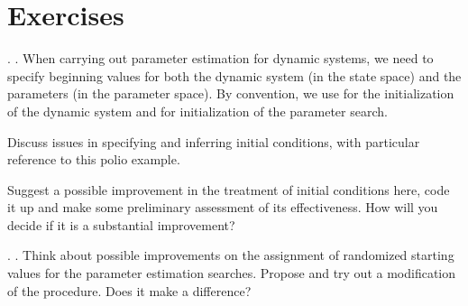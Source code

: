 \section{Exercises}


\begin{frame}[fragile]

\myexercise. . When carrying out parameter estimation for dynamic systems, we need to specify beginning values for both the dynamic system (in the state space) and the parameters (in the parameter space). By convention, we use   for the initialization of the dynamic system and  for initialization of the parameter search.

Discuss issues in specifying and inferring initial conditions, with particular reference to this polio example. 

Suggest a possible improvement in the treatment of initial conditions here, code it up and make some preliminary assessment of its effectiveness. How will you decide if it is a substantial improvement? 

\vspace{3mm}

\href{https://kingaa.github.io/sbied/polio/initial-values-exercise.html}{}


\end{frame}

\begin{frame}[fragile]

\myexercise. .
Think about possible improvements on the assignment of randomized starting values for the parameter estimation searches. Propose and try out a modification of the procedure. Does it make a difference?

\vspace{3mm}

\href{https://kingaa.github.io/sbied/polio/starting-values-exercise.html}{}

\end{frame}

